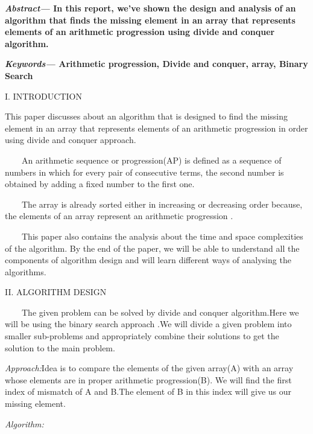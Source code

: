 \documentclass[12pt,a4paper]{article}
\begin{document}
\begin{multicols}{2}
\textbf{\textit{Abstract--- }In this report, we've shown the design and analysis of an algorithm that finds the missing element in an array that represents elements of an arithmetic progression using divide and conquer algorithm.}

\textbf{\textit{Keywords--- } Arithmetic progression, Divide and conquer, array, Binary Search }

\begin{center}I. INTRODUCTION\end{center}

This paper discusses about an algorithm that is  designed to  find the missing element in an array that represents elements of an arithmetic progression in order using divide and conquer approach.

\ \ \ \  An arithmetic sequence or progression(AP) is defined as a sequence of numbers in which for every pair of consecutive terms, the second number is obtained by adding a fixed number to the first one.

\ \ \ \ The array is already sorted either in increasing or decreasing order because, the elements of an array represent an arithmetic progression . 
 
\ \ \ \ This paper also contains the analysis about the time and space complexities of the algorithm. By the end of the paper, we will be able to understand all the components of algorithm design and will learn different ways of analysing the 
algorithms. 

\begin{center}II. ALGORITHM DESIGN\end{center}

\ \ \ \ The given problem can be solved by divide and conquer algorithm.Here we will be using the binary search approach .We will divide a given problem into smaller sub-problems and appropriately combine their solutions to get the solution to the main problem.  


\textit{  Approach:}Idea is to compare the elements of the given array(A) with an array whose elements are in proper arithmetic progression(B). We will find the first index of mismatch of A and B.The element of B in this index will give us our missing element.


\textit{  Algorithm:}


\end{multicols}
\end{document}
